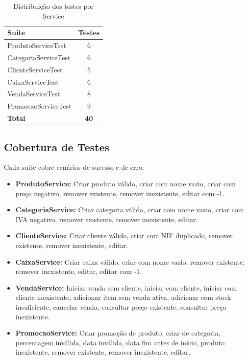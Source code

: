 \documentclass[a4paper]{llncs}
\begin{document}
\begin{table}[H]
    \centering
    \begin{tabular}{l c}
        \toprule
        \textbf{Suite} & \textbf{Testes} \\
        \midrule
        ProdutoServiceTest & 6 \\
        CategoriaServiceTest & 6 \\
        ClienteServiceTest & 5 \\
        CaixaServiceTest & 6 \\
        VendaServiceTest & 8 \\
        PromocaoServiceTest & 9 \\
        \midrule
        \textbf{Total} & \textbf{40} \\
        \bottomrule
    \end{tabular}
    \caption{Distribuição dos testes por Service}
\end{table}

\subsection{Cobertura de Testes}

Cada suite cobre cenários de sucesso e de erro:

\begin{itemize}
    \item \textbf{ProdutoService:} Criar produto válido, criar com nome vazio, criar com preço negativo, remover existente, remover inexistente, editar com -1.
    \item \textbf{CategoriaService:} Criar categoria válida, criar com nome vazio, criar com IVA negativo, remover existente, remover inexistente, editar.
    \item \textbf{ClienteService:} Criar cliente válido, criar com NIF duplicado, remover existente, remover inexistente, editar.
    \item \textbf{CaixaService:} Criar caixa válido, criar com nome vazio, remover existente, remover inexistente, editar, editar com -1.
    \item \textbf{VendaService:} Iniciar venda sem cliente, iniciar com cliente, iniciar com cliente inexistente, adicionar item sem venda ativa, adicionar com stock insuficiente, cancelar venda, consultar preço existente, consultar preço inexistente.
    \item \textbf{PromocaoService:} Criar promoção de produto, criar de categoria, percentagem inválida, data inválida, data fim antes de início, produto inexistente, remover existente, remover inexistente, editar.
\end{itemize}
\end{document}
